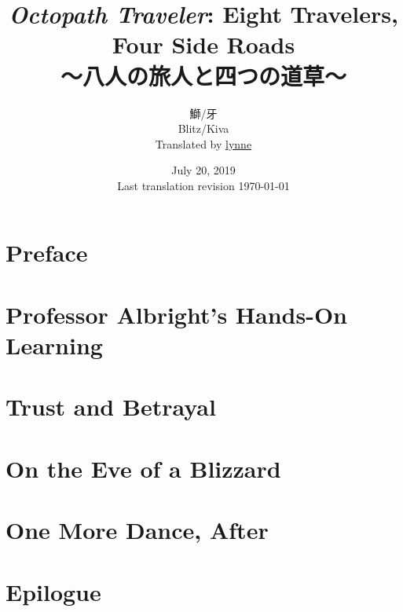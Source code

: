 \documentclass[a4paper,11pt]{memoir}
\title{%
\emph{Octopath Traveler}: Eight Travelers, Four Side Roads \\
\large{～八人の旅人と四つの道草～}
}
\author{%
鰤/牙 \\
Blitz/Kiva \\
Translated by \href{https://lynne.bearblog.dev}{lynne}
}
\date{%
July 20, 2019 \\
Last translation revision \today
}
\begin{document}
	\maketitle
	\pagebreak
	\tableofcontents*
	\frontmatter
	\chapter{Preface}
		
	\mainmatter
	\chapter{Professor Albright's Hands-On Learning}
		
	\chapter{Trust and Betrayal}
		
	\chapter{On the Eve of a Blizzard}
	\chapter{One More Dance, After}
		
	\chapter{Epilogue}
\end{document}
